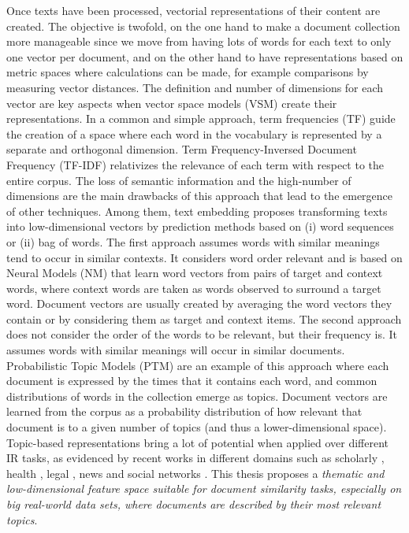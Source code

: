 Once texts have been processed, vectorial representations of their content are created. The objective is twofold, on the one hand to make a document collection more manageable since we move from having lots of words for each text to only one vector per document, and on the other hand to have representations based on metric spaces where calculations can be made, for example comparisons by measuring vector distances. The definition and number of dimensions for each vector are key aspects when vector space models (VSM) create their representations. In a common and simple approach, term frequencies (TF) guide the creation of a space where each word in the vocabulary is represented by a separate and orthogonal dimension. Term Frequency-Inversed Document Frequency (TF-IDF) relativizes the relevance of each term with respect to the entire corpus. The loss of semantic information and the high-number of dimensions are the main drawbacks of this approach that lead to the emergence of other techniques. Among them, text embedding proposes transforming texts into low-dimensional vectors by prediction methods based on (i) word sequences or (ii) bag of words. The first approach assumes words with similar meanings tend to occur in similar contexts. It considers word order relevant and is based on Neural Models (NM) that learn word vectors from pairs of target and context words, where context words are taken as words observed to surround a target word. Document vectors are usually created by averaging the word vectors they contain or by considering them as target and context items. The second approach does not consider the order of the words to be relevant, but their frequency is. It assumes words with similar meanings will occur in similar documents. Probabilistic Topic Models (PTM) are an example of this approach where each document is expressed by the times that it contains each word, and common distributions of words in the collection emerge as topics. Document vectors are learned from the corpus as a probability distribution of how relevant that document is to a given number of topics (and thus a lower-dimensional space). Topic-based representations bring a lot of potential when applied over different IR tasks, as evidenced by recent works in different domains such as scholarly  \citep{Gatti2015}, health \citep{Lu2016,TapiNzali2017}, legal \citep{ONeill2017,Greene2016}, news \citep{He2017} and social networks \citep{Cheng2014a}. This thesis proposes a \textit{thematic and low-dimensional feature space suitable for document similarity tasks, especially on big real-world data sets, where documents are described by their most relevant topics}. 



